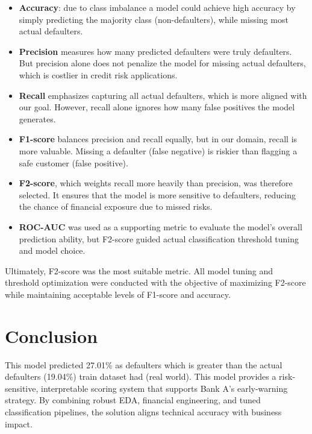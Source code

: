 \documentclass[12pt,a4paper]{article}
\begin{document}
\begin{itemize}
    \item \textbf{Accuracy}: due to class imbalance a model could achieve high accuracy by simply predicting the majority class (non-defaulters), while missing most actual defaulters.
    \item \textbf{Precision} measures how many predicted defaulters were truly defaulters. But precision alone does not penalize the model for missing actual defaulters, which is costlier in credit risk applications.
    \item \textbf{Recall} emphasizes capturing all actual defaulters, which is more aligned with our goal. However, recall alone ignores how many false positives the model generates.
    \item \textbf{F1-score} balances precision and recall equally, but in our domain, recall is more valuable. Missing a defaulter (false negative) is riskier than flagging a safe customer (false positive).
    \item \textbf{F2-score}, which weights recall more heavily than precision, was therefore selected. It ensures that the model is more sensitive to defaulters, reducing the chance of financial exposure due to missed risks.
    \item \textbf{ROC-AUC} was used as a supporting metric to evaluate the model's overall prediction ability, but F2-score guided actual classification threshold tuning and model choice.
\end{itemize}

Ultimately, F2-score was the most suitable metric. All model tuning and threshold optimization were conducted with the objective of maximizing F2-score while maintaining acceptable levels of F1-score and accuracy.

\section{Conclusion}

This model predicted 27.01\% as defaulters which is greater than the actual defaulters (19.04\%) train dataset had (real world). This model provides a risk-sensitive, interpretable scoring system that supports Bank A's early-warning strategy. By combining robust EDA, financial engineering, and tuned classification pipelines, the solution aligns technical accuracy with business impact.
\end{document}
